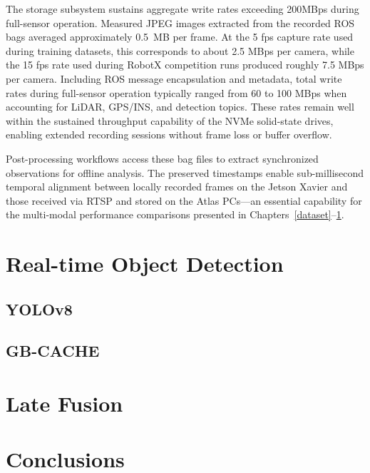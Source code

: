 \documentclass{erauthesis}
\begin{document}
The storage subsystem sustains aggregate write rates exceeding 200MBps during full-sensor operation.
Measured JPEG images extracted from the recorded ROS bags averaged approximately 0.5~MB per frame.
At the 5 fps capture rate used during training datasets, this corresponds to about 2.5 MBps per camera, while the 15 fps rate used during RobotX competition runs produced roughly 7.5 MBps per camera. 
Including ROS message encapsulation and metadata, total write rates during full-sensor operation typically ranged from 60 to 100 MBps when accounting for LiDAR, GPS/INS, and detection topics. 
These rates remain well within the sustained throughput capability of the NVMe solid-state drives, enabling extended recording sessions without frame loss or buffer overflow.

Post-processing workflows access these bag files to extract synchronized observations for offline analysis.
The preserved timestamps enable sub-millisecond temporal alignment between locally recorded frames on the Jetson Xavier and those received via RTSP and stored on the Atlas PCs—an essential capability for the multi-modal performance comparisons presented in Chapters~\ref{dataset}–\ref{realtime_object_detection}.

\chapter{Real-time Object Detection} \label{realtime_object_detection}

    \section{YOLOv8} \label{yolo}

    \section{GB-CACHE} \label{gbcache}

\chapter{Late Fusion} \label{late_fusion}

\chapter{Conclusions} 

\end{document}
